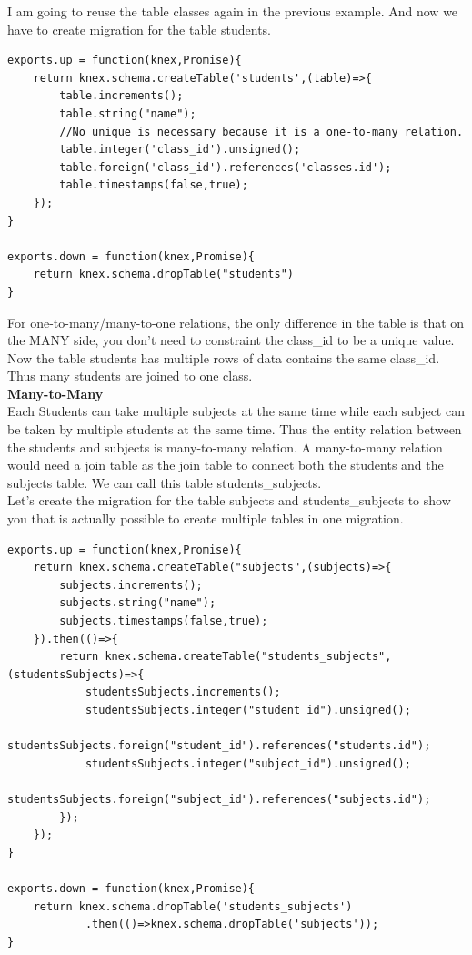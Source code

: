 \documentclass[a4paper]{article}
\begin{document}
I am going to reuse the table classes again in the previous example. And now we have to create migration for the table students.
\begin{lstlisting}
exports.up = function(knex,Promise){
    return knex.schema.createTable('students',(table)=>{
        table.increments();
        table.string("name");
        //No unique is necessary because it is a one-to-many relation.
        table.integer('class_id').unsigned();
        table.foreign('class_id').references('classes.id');
        table.timestamps(false,true);
    });
}

exports.down = function(knex,Promise){
    return knex.schema.dropTable("students")
}
\end{lstlisting}
For one-to-many/many-to-one relations, the only difference in the table is that on the MANY side, you don’t need to constraint the class\_id to be a unique value. Now the table students has multiple rows of data contains the same class\_id. Thus many students are joined to one class.\\

\textbf{Many-to-Many}\\

Each Students can take multiple subjects at the same time while each subject can be taken by multiple students at the same time. Thus the entity relation between the students and subjects is many-to-many relation. A many-to-many relation would need a join table as the join table to connect both the students and the subjects table. We can call this table students\_subjects.\\

Let’s create the migration for the table subjects and students\_subjects to show you that is actually possible to create multiple tables in one migration.
\begin{lstlisting}
exports.up = function(knex,Promise){
    return knex.schema.createTable("subjects",(subjects)=>{
        subjects.increments();
        subjects.string("name");
        subjects.timestamps(false,true);
    }).then(()=>{
        return knex.schema.createTable("students_subjects",(studentsSubjects)=>{
            studentsSubjects.increments();
            studentsSubjects.integer("student_id").unsigned();
            studentsSubjects.foreign("student_id").references("students.id");
            studentsSubjects.integer("subject_id").unsigned();
            studentsSubjects.foreign("subject_id").references("subjects.id");
        });
    });
}

exports.down = function(knex,Promise){
    return knex.schema.dropTable('students_subjects')
            .then(()=>knex.schema.dropTable('subjects'));
}
\end{lstlisting}
\end{document}
